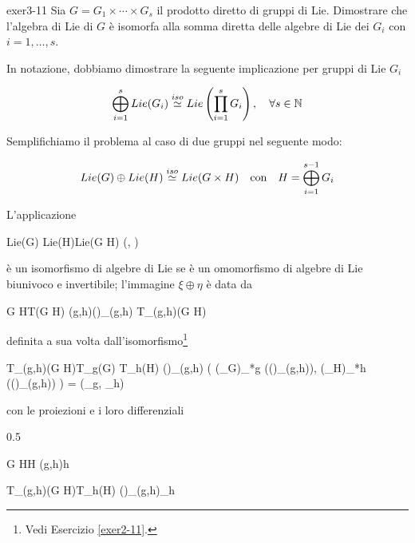 {exer3-11}
{
Sia $ G = G_{1} \times \cdots \times G_{s} $ il prodotto diretto di gruppi di Lie. Dimostrare che l'algebra di Lie di $ G $ è isomorfa alla somma diretta delle algebre di Lie dei $ G_{i} $ con $ i=1,\dots,s $.
}
{

In notazione, dobbiamo dimostrare la seguente implicazione per gruppi di Lie $ G_{i} $

\begin{equation}
	\bigoplus_{i=1}^{s} Lie(G_{i}) \stackrel{iso}{\simeq} Lie \left( \prod_{i=1}^{s} G_{i} \right) %
	\qcomma \forall s \in \N
\end{equation}

Semplifichiamo il problema al caso di due gruppi nel seguente modo:

\begin{equation}
	Lie(G) \oplus Lie(H) \stackrel{iso}{\simeq} Lie(G \times H) %
	\qq{con} %
	H = \bigoplus_{i=1}^{s-1} G_{i}
\end{equation}

L'applicazione

\map{\psi}
	{Lie(G) \oplus Lie(H)}{Lie(G \times H)}
	{(\xi, \eta)}{\xi \oplus \eta}

è un isomorfismo di algebre di Lie se è un omomorfismo di algebre di Lie biunivoco e invertibile; l'immagine $ \xi \oplus \eta $ è data da

\map{\xi \oplus \eta}
	{G \times H}{T(G \times H)}
	{(g,h)}{(\xi \oplus \eta)_{(g,h)} \in T_{(g,h)}(G \times H)}

definita a sua volta dall'isomorfismo\footnote{%
	Vedi Esercizio \ref{exer2-11}.%
}

	{T_{(g,h)}(G \times H)}{T_{g}(G) \times T_{h}(H)}
	{(\xi \oplus \eta)_{(g,h)}}
	{ %
		\left( (\pi_{G})_{*g} ((\xi \oplus \eta)_{(g,h)}), (\pi_{H})_{*h} ((\xi \oplus \eta)_{(g,h)}) \right) = (\xi_{g}, \eta_{h})
	}

con le proiezioni e i loro differenziali

	{0.5}{%
				{G \times H}{H}
				{(g,h)}{h}
			
				{T_{(g,h)}(G \times H)}{T_{h}(H)}
				{(\xi \oplus \eta)_{(g,h)}}{\eta_{h}}
			}

}
